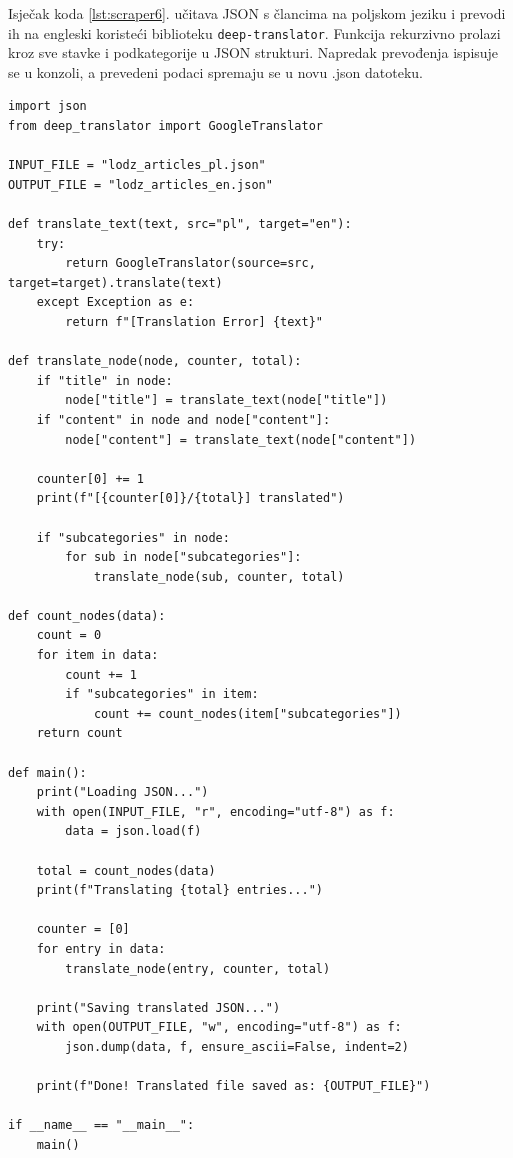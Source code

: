 \documentclass[]{foi}
\begin{document}
Isječak koda \ref{lst:scraper6}. učitava JSON s člancima na poljskom jeziku i prevodi ih na engleski koristeći biblioteku \verb|deep-translator|. Funkcija rekurzivno prolazi
kroz sve stavke i podkategorije u JSON strukturi. Napredak prevođenja ispisuje se u konzoli, a prevedeni podaci spremaju se u novu .json
datoteku.
\begin{longlisting}
\begin{verbatim}
import json
from deep_translator import GoogleTranslator

INPUT_FILE = "lodz_articles_pl.json"
OUTPUT_FILE = "lodz_articles_en.json"

def translate_text(text, src="pl", target="en"):
    try:
        return GoogleTranslator(source=src, target=target).translate(text)
    except Exception as e:
        return f"[Translation Error] {text}"

def translate_node(node, counter, total):
    if "title" in node:
        node["title"] = translate_text(node["title"])
    if "content" in node and node["content"]:
        node["content"] = translate_text(node["content"])

    counter[0] += 1
    print(f"[{counter[0]}/{total}] translated")

    if "subcategories" in node:
        for sub in node["subcategories"]:
            translate_node(sub, counter, total)

def count_nodes(data):
    count = 0
    for item in data:
        count += 1
        if "subcategories" in item:
            count += count_nodes(item["subcategories"])
    return count

def main():
    print("Loading JSON...")
    with open(INPUT_FILE, "r", encoding="utf-8") as f:
        data = json.load(f)

    total = count_nodes(data)
    print(f"Translating {total} entries...")

    counter = [0] 
    for entry in data:
        translate_node(entry, counter, total)

    print("Saving translated JSON...")
    with open(OUTPUT_FILE, "w", encoding="utf-8") as f:
        json.dump(data, f, ensure_ascii=False, indent=2)

    print(f"Done! Translated file saved as: {OUTPUT_FILE}")

if __name__ == "__main__":
    main()
\end{verbatim}
\caption{Scraper 6/6}
\label{lst:scraper6}
\end{longlisting}
\end{document}
